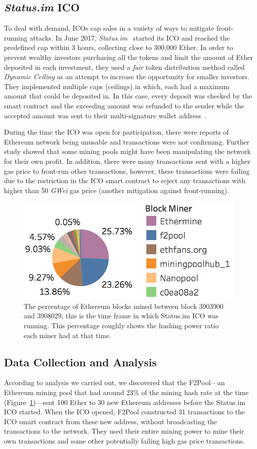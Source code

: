 \subsection{\textit{Status.im} ICO}
To deal with demand, ICOs cap sales in a variety of ways to mitigate front-running attacks. In June 2017, \textit{Status.im}~\cite{statuswhitepaper} started its ICO and reached the predefined cap within 3 hours, collecting close to 300,000 Ether. In order to prevent wealthy investors purchasing all the tokens and limit the amount of Ether deposited in each investment, they used a \textit{fair} token distribution method called \textit{Dynamic Ceiling} as an attempt to increase the opportunity for smaller investors. They implemented multiple caps (ceilings) in which, each had a maximum amount that could be deposited in. In this case, every deposit was checked by the smart contract and the exceeding amount was refunded to the sender while the accepted amount was sent to their multi-signature wallet address~\cite{statusicoanalysis}. 

During the time the ICO was open for participation, there were reports of Ethereum network being unusable and transactions were not confirming. Further study showed that some mining pools might have been manipulating the network for their own profit. In addition, there were many transactions sent with a higher gas price to front-run other transactions, however, these transactions were failing due to the restriction in the ICO smart contract to reject any transactions with higher than 50 \textit{GWei} gas price (another mitigation against front-running).

\begin{figure}[t]
\centering
\includegraphics[width=0.5\linewidth]{figures/Mining_pool_ratio.png}
\caption{ The percentage of Ethereum blocks mined between block 3903900 and 3908029, this is the time frame in which Status.im ICO was running. This percentage roughly shows the hashing power ratio each miner had at that time. \label{fig:mining_pool_ratio}} %
\end{figure}

\subsection{Data Collection and Analysis}
According to analysis we carried out, we discovered that the F2Pool---an Ethereum mining pool that had around 23\% of the mining hash rate at the time (Figure~\ref{fig:mining_pool_ratio})---sent 100 Ether to 30 new Ethereum addresses before the Status.im ICO started. When the ICO opened, F2Pool constructed 31 transactions to the ICO smart contract from these new address, without broadcasting the transactions to the network. They used their entire mining power to mine their own transactions and some other potentially failing high gas price transactions.

